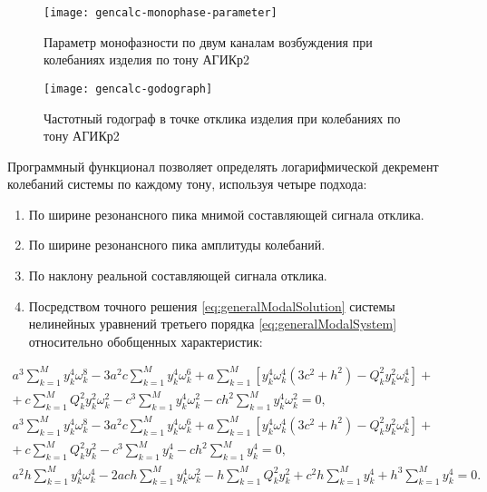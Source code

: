 \begin{figure}[!htb]
	\centerfloat
	\texttt{[image: gencalc-monophase-parameter]}
	\caption{Параметр монофазности по двум каналам возбуждения при колебаниях изделия по тону АГИКр2} \label{fig:gencalc-monophase-parameter}
\end{figure}

\begin{figure}[!htb]
	\centerfloat
	\texttt{[image: gencalc-godograph]}
	\caption{Частотный годограф в точке отклика изделия при колебаниях по тону АГИКр2} \label{fig:gencalc-godograph}
\end{figure}

Программный функционал позволяет определять логарифмической декремент колебаний системы по каждому тону, используя четыре подхода:
\begin{enumerate}[topsep = 0pt, noitemsep]
	\item По ширине резонансного пика мнимой составляющей сигнала отклика.
	\item По ширине резонансного пика амплитуды колебаний.
	\item По наклону реальной составляющей сигнала отклика.
	\item Посредством точного решения \eqref{eq:generalModalSolution} системы нелинейных уравнений третьего порядка \eqref{eq:generalModalSystem} относительно обобщенных характеристик:
\end{enumerate}

\begin{equation}
	\begin{aligned}
		a ^ 3 \sum_{k = 1} ^ M y_k ^ 4 \omega_k ^ 8 - 3 a ^ 2 c \sum_{k = 1} ^ M y_k ^ 4 \omega_k ^ 6 + a \sum_{k = 1} ^ M \left[ y_k ^ 4 \omega_k ^ 4 \left(3 c ^ 2 + h ^ 2 \right) - Q_k ^ 2 y_k ^ 2 \omega_k ^ 4 \right] + \\
		+ \ c \sum_{k = 1} ^ M Q_k ^ 2 y_k ^ 2 \omega_k ^ 2 - c ^ 3 \sum_{k = 1} ^ M y_k ^ 4 \omega_k ^ 2 - c h ^ 2 \sum_{k = 1} ^ M y_k ^ 4 \omega_k ^ 2 = 0, \\
		a ^ 3 \sum_{k = 1} ^ M y_k ^ 4 \omega_k ^ 8 - 3 a ^ 2 c \sum_{k = 1} ^ M y_k ^ 4 \omega_k ^ 6 + a \sum_{k = 1} ^ M \left[ y_k ^ 4 \omega_k ^ 4 \left(3 c ^ 2 + h ^ 2 \right) - Q_k ^ 2 y_k ^ 2 \omega_k ^ 4 \right] + \\
		+ \ c \sum_{k = 1} ^ M Q_k ^ 2 y_k ^ 2 - c ^ 3 \sum_{k = 1} ^ M y_k ^ 4 - c h ^ 2 \sum_{k = 1} ^ M y_k ^ 4 = 0, \\
		a ^ 2 h \sum_{k = 1} ^ M y_k ^ 4 \omega_k ^ 4 - 2 a c h \sum_{k = 1} ^ M y_k ^ 4 \omega_k ^ 2 - h \sum_{k = 1} ^ M Q_k ^ 2 y_k ^ 2 + c ^ 2 h \sum_{k = 1} ^ M y_k ^ 4 + h ^ 3 \sum_{k = 1} ^ M y_k ^ 4 = 0. 
	\end{aligned}
	\label{eq:generalModalSystem}
\end{equation}

